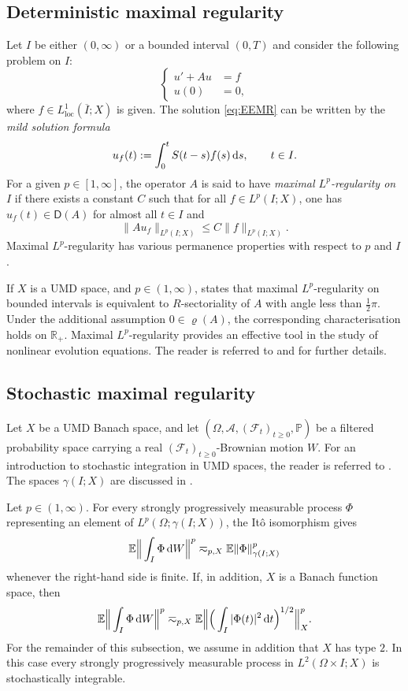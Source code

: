 \documentclass{amsart}
\let\leq\leqslant
\let\geq\geqslant
\theoremstyle{plain}
\theoremstyle{remark}
\theoremstyle{plain}
\numberwithin{equation}{section}
\newcommand{\R}{\mathbb R}
\newcommand{\E}{\mathbb E}
\newcommand{\1}{\mathbf 1}
\newcommand{\dd}{\,{\rm d}}
\newcommand{\Dom}{\mathsf{D}}
\DeclareMathOperator{\loc}{loc}
\renewcommand{\P}{\mathbb{P}}
\begin{document}
\subsection{Deterministic  maximal regularity} Let $I$ be either $(0,\infty)$ or a bounded interval $(0,T)$ and consider the following problem on  $I$:
\begin{equation}
\label{eq:EEMR}
\left\{
\begin{aligned}
u' + A u  &= f\,\\
u(0)&=0,
\end{aligned}
\right.
\end{equation}
where $f\in L^1_{\loc}(\overline{I};X)$ is given. The solution \eqref{eq:EEMR} can be written by the {\em mild solution formula}
\[u_f(t) := \int_0^t S(t-s) f(s) \dd s, \qquad t \in I.\]
For a given $p\in [1, \infty]$, the operator $A$ is said to have {\em maximal $L^p$-regularity on $I$} if
there exists a constant $C$ such that for all $f\in L^p(I;X)$, one has
$u_f(t)\in \Dom(A)$ for almost all $t\in I$ and
\[\|A u_f\|_{L^p(I;X)}\leq C \|f\|_{L^p(I;X)}.\]
Maximal $L^p$-regularity has various permanence properties with respect to $p$ and $I$. 

If $X$ is a UMD space, and $p\in(1,\infty)$, \cite{Weis-MathAnn} states that maximal
$L^p$-regularity on bounded intervals is equivalent to
$R$-sectoriality of $A$ with angle less than $\frac12\pi$. 
Under the additional assumption $0\in\varrho(A)$, the corresponding
characterisation holds on $\R_+$.
Maximal $L^p$-regularity provides an effective tool in the study of nonlinear evolution equations. The reader is referred to \cite[Chapters 17, 18]{HNVW3} and \cite{pruss2016moving} for further details.

\subsection{Stochastic maximal regularity}
Let $X$ be a UMD Banach space, and let $(\Omega,\mathcal A,(\mathcal F_t)_{t\geq0},\P)$ be a filtered probability space carrying a real $(\mathcal F_t)_{t\geq0}$-Brownian motion $W$. For an introduction to  stochastic integration in UMD spaces, the reader is referred to \cite{NVWco,NVW-UMD,NVW-survey}. The spaces $\gamma(I;X)$ are discussed in \cite[Chapter 9]{HNVW2}.

Let $p\in(1,\infty)$.
For every strongly progressively measurable process $\Phi$ representing an element of $L^p(\Omega;\gamma(I;X))$, the It\^o isomorphism gives
\begin{align}\label{eq:Ito}
\E\Big\|\int_I\Phi\dd W\Big\|^p
\eqsim_{p,X}
\E\|\Phi\|_{\gamma(I;X)}^p
\end{align}
whenever the right-hand side is finite. If, in addition, $X$ is a Banach function space, then
\begin{align}\label{eq:Ito2}
\E\Big\|\int_I\Phi\dd W\Big\|^p
\eqsim_{p,X}
\E\Big\|\Big(\int_I|\Phi(t)|^2\dd t\Big)^{1/2}\Big\|_X^p.
\end{align}
For the remainder of this subsection, we assume in addition that $X$ has type $2$. In this case every strongly progressively measurable process in $L^2(\Omega\times I;X)$ is stochastically integrable.
\end{document}
